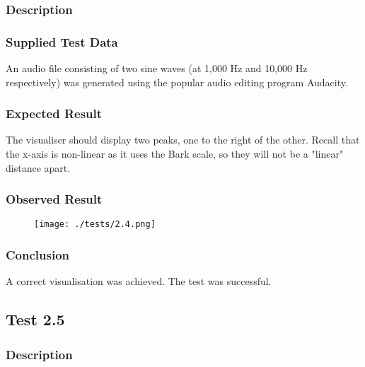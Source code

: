 \subsubsection*{Description}
\paragraph{}
{
	\centering
}

\subsubsection*{Supplied Test Data}
An audio file consisting of two sine waves (at 1,000 Hz and 10,000 Hz respectively) was generated using the popular audio editing program Audacity.

\subsubsection*{Expected Result}
The visualiser should display two peaks, one to the right of the other. Recall that the x-axis is non-linear as it uses the Bark scale, so they will not be a "linear" distance apart.

\subsubsection*{Observed Result}
\label{sec:evidence2.4}
\begin{figure}[H]
	\texttt{[image: ./tests/2.4.png]}
\end{figure}

\subsubsection*{Conclusion}
A correct visualisation was achieved. The test was successful.


\pagebreak
\subsection{Test 2.5}
\subsubsection*{Description}
\paragraph{}
{
	\centering
}

